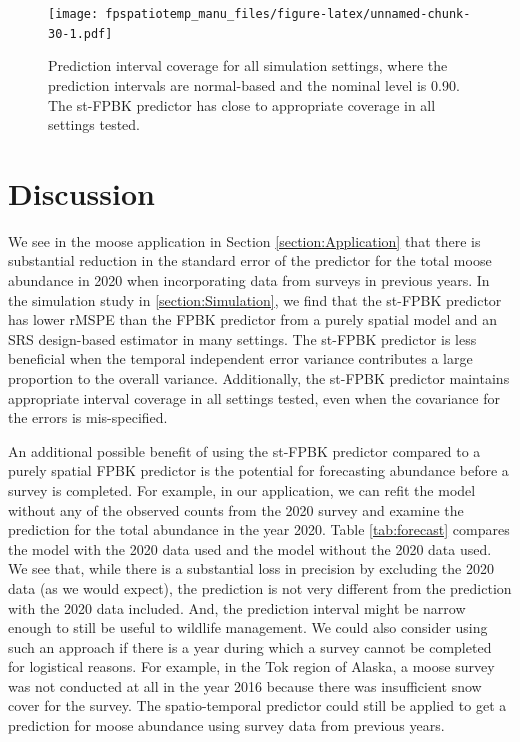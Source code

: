 \documentclass[]{interact}
\theoremstyle{plain}%
\theoremstyle{definition}
\theoremstyle{remark}
\begin{document}
\begin{figure}
\centering
\texttt{[image: fpspatiotemp\_manu\_files/figure-latex/unnamed-chunk-30-1.pdf]}
\caption{\label{fig:pi} Prediction interval coverage for all simulation
settings, where the prediction intervals are normal-based and the
nominal level is 0.90. The st-FPBK predictor has close to appropriate
coverage in all settings tested.}
\end{figure}

\section{Discussion} \label{section:Discussion}

We see in the moose application in Section \ref{section:Application}
that there is substantial reduction in the standard error of the
predictor for the total moose abundance in 2020 when incorporating data
from surveys in previous years. In the simulation study in
\ref{section:Simulation}, we find that the st-FPBK predictor has lower
rMSPE than the FPBK predictor from a purely spatial model and an SRS
design-based estimator in many settings. The st-FPBK predictor is less
beneficial when the temporal independent error variance contributes a
large proportion to the overall variance. Additionally, the st-FPBK
predictor maintains appropriate interval coverage in all settings
tested, even when the covariance for the errors is mis-specified.

An additional possible benefit of using the st-FPBK predictor compared
to a purely spatial FPBK predictor is the potential for forecasting
abundance before a survey is completed. For example, in our application,
we can refit the model without any of the observed counts from the 2020
survey and examine the prediction for the total abundance in the year
2020. Table \ref{tab:forecast} compares the model with the 2020 data
used and the model without the 2020 data used. We see that, while there
is a substantial loss in precision by excluding the 2020 data (as we
would expect), the prediction is not very different from the prediction
with the 2020 data included. And, the prediction interval might be
narrow enough to still be useful to wildlife management. We could also
consider using such an approach if there is a year during which a survey
cannot be completed for logistical reasons. For example, in the Tok
region of Alaska, a moose survey was not conducted at all in the year
2016 because there was insufficient snow cover for the survey. The
spatio-temporal predictor could still be applied to get a prediction for
moose abundance using survey data from previous years.
\end{document}
